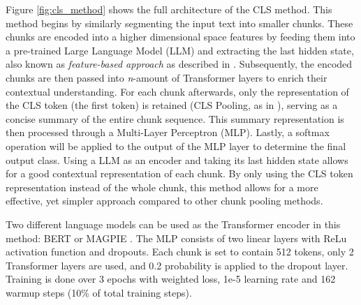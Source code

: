 Figure \ref{fig:cls_method} shows the full architecture of the CLS method. This method begins by similarly segmenting the input text into smaller chunks. These chunks are encoded into a higher dimensional space features by feeding them into a pre-trained Large Language Model (LLM) and extracting the last hidden state, also known as \textit{feature-based approach} as described in \cite{sun-2020-fine-tune}. Subsequently, the encoded chunks are then passed into \textit{n}-amount of Transformer layers to enrich their contextual understanding. For each chunk afterwards, only the representation of the CLS token (the first token) is retained (CLS Pooling, as in \cite{su-2021-classifying}), serving as a concise summary of the entire chunk sequence. This summary representation is then processed through a Multi-Layer Perceptron (MLP). Lastly, a softmax operation will be applied to the output of the MLP layer to determine the final output class. Using a LLM as an encoder and taking its last hidden state allows for a good contextual representation of each chunk. By only using the CLS token representation instead of the whole chunk, this method allows for a more effective, yet simpler approach compared to other chunk pooling methods.

Two different language models can be used as the Transformer encoder in this method: BERT \cite{devlin-2019-bert} or MAGPIE \cite{horych-2024-magpie}. The MLP consists of two linear layers with ReLu activation function \cite{agarap-2018-relu} and dropouts. Each chunk is set to contain 512 tokens, only 2 Transformer layers are used, and 0.2 probability is applied to the dropout layer. Training is done over 3 epochs with weighted loss, 1e-5 learning rate and 162 warmup steps (10\% of total training steps).

